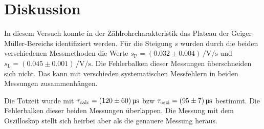 \section{Diskussion}
In diesem Versuch konnte in der Zählrohrcharakteristik das Plateau der Geiger-Müller-Bereichs identifiziert werden.
Für die Steigung $s$ wurden durch die beiden verschiedenen Messmethoden die Werte $s_\text{P} = (0.032 \pm 0.004) \, \unit{\per\volt\per\second}$ und $s_\text{L} = (0.045 \pm 0.001) \, \unit{\per\volt\per\second}$.
Die Fehlerbalken dieser Messungen überschneiden sich nicht. 
Das kann mit verschieden systematischen Messfehlern in beiden Messungen zusammenhängen.

Die Totzeit  wurde mit $\tau_\text{calc} = \qty[]{120 +- 60}{\micro\second}$ bzw $\tau_\text{oszi} = \qty[]{95 +- 7}{\micro\second}$ bestimmt.
Die Fehlerbalken dieser beiden Messungen überlappen.
Die Messung mit dem Oszilloskop stellt sich heirbei aber als die genauere Messung heraus.